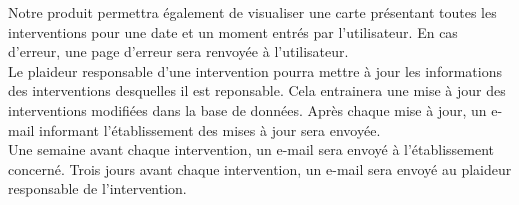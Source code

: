 Notre produit permettra également de visualiser une carte présentant toutes les interventions pour une date et un moment entrés par l'utilisateur. En cas d'erreur, une page d'erreur sera renvoyée à l'utilisateur. \\

Le plaideur responsable d'une intervention pourra mettre à jour les informations des interventions desquelles il est reponsable. Cela entrainera une mise à jour des interventions modifiées dans la base de données. Après chaque mise à jour, un e-mail informant l'établissement des mises à jour sera envoyée. \\

Une semaine avant chaque intervention, un e-mail sera envoyé à l'établissement concerné.  
Trois jours avant chaque intervention, un e-mail sera envoyé au plaideur responsable de l'intervention. 



